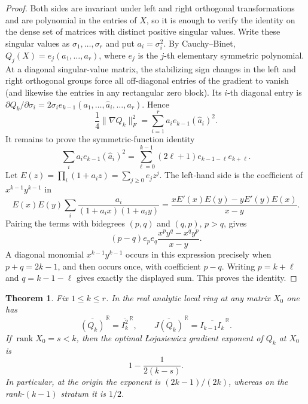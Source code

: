 \documentclass[11pt]{article}
\newtheorem{theorem}{Theorem}[section]
\theoremstyle{definition}
\theoremstyle{remark}
\begin{document}
\begin{proof}
Both sides are invariant under left and right orthogonal transformations and are polynomial in the entries of $X$, so it is enough to verify the identity on the dense set of matrices with distinct positive singular values. Write these singular values as $\sigma_1,\ldots,\sigma_r$ and put $a_i=\sigma_i^2$. By Cauchy--Binet, $Q_j(X)=e_j(a_1,\ldots,a_r)$, where $e_j$ is the $j$-th elementary symmetric polynomial. At a diagonal singular-value matrix, the stabilizing sign changes in the left and right orthogonal groups force all off-diagonal entries of the gradient to vanish (and likewise the entries in any rectangular zero block). Its $i$-th diagonal entry is
$\partial Q_k/\partial\sigma_i=2\sigma_i e_{k-1}(a_1,\ldots,\widehat a_i,\ldots,a_r)$. Hence
$$
\frac14\|\nabla Q_k\|_F^2
=\sum_{i=1}^r a_i e_{k-1}(\widehat a_i)^2.
$$
It remains to prove the symmetric-function identity
$$
\sum_i a_i e_{k-1}(\widehat a_i)^2
=\sum_{\ell=0}^{k-1}(2\ell+1)e_{k-1-\ell}e_{k+\ell}.
$$
Let $E(z)=\prod_i(1+a_i z)=\sum_{j\ge0}e_jz^j$. The left-hand side is the coefficient of $x^{k-1}y^{k-1}$ in
$$
E(x)E(y)\sum_i\frac{a_i}{(1+a_ix)(1+a_iy)}
=\frac{xE'(x)E(y)-yE'(y)E(x)}{x-y}.
$$
Pairing the terms with bidegrees $(p,q)$ and $(q,p)$, $p>q$, gives
$$
(p-q)e_pe_q\frac{x^py^q-x^qy^p}{x-y}.
$$
A diagonal monomial $x^{k-1}y^{k-1}$ occurs in this expression precisely when $p+q=2k-1$, and then occurs once, with coefficient $p-q$. Writing $p=k+\ell$ and $q=k-1-\ell$ gives exactly the displayed sum. This proves the identity.
\end{proof}

\begin{theorem}\label{thm:determinantal-Simon}
Fix $1\le k\le r$. In the real analytic local ring at any matrix $X_0$ one has
$$
\overline{(Q_k)}^{\,\mathbb R}=\overline{I_k^2}^{\,\mathbb R},
\qquad
\overline{J(Q_k)}^{\,\mathbb R}=\overline{I_{k-1}I_k}^{\,\mathbb R}.
$$
If $\operatorname{rank}X_0=s<k$, then the optimal \L{}ojasiewicz gradient exponent of $Q_k$ at $X_0$ is
$$
1-\frac{1}{2(k-s)}.
$$
In particular, at the origin the exponent is $(2k-1)/(2k)$, whereas on the rank-$(k-1)$ stratum it is $1/2$.
\end{theorem}
\end{document}
